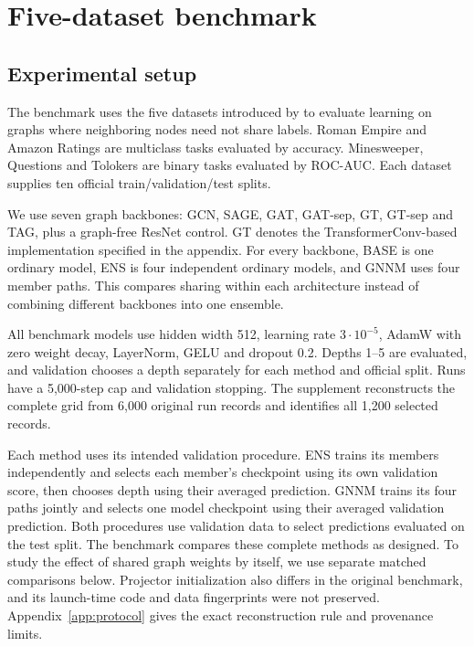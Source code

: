 \section{Five-dataset benchmark}\label{sec:original-benchmark}
\subsection{Experimental setup}
The benchmark uses the five datasets introduced by \citet{platonov2023critical} to evaluate learning on graphs where neighboring nodes need not share labels. Roman Empire and Amazon Ratings are multiclass tasks evaluated by accuracy. Minesweeper, Questions and Tolokers are binary tasks evaluated by ROC-AUC. Each dataset supplies ten official train/validation/test splits.

We use seven graph backbones: GCN, SAGE, GAT, GAT-sep, GT, GT-sep and TAG, plus a graph-free ResNet control. GT denotes the TransformerConv-based implementation specified in the appendix. For every backbone, BASE is one ordinary model, ENS is four independent ordinary models, and GNNM uses four member paths. This compares sharing within each architecture instead of combining different backbones into one ensemble.

All benchmark models use hidden width 512, learning rate $3\cdot10^{-5}$, AdamW with zero weight decay, LayerNorm, GELU and dropout 0.2. Depths 1--5 are evaluated, and validation chooses a depth separately for each method and official split. Runs have a 5,000-step cap and validation stopping. The supplement reconstructs the complete grid from 6,000 original run records and identifies all 1,200 selected records.

Each method uses its intended validation procedure. ENS trains its members independently and selects each member's checkpoint using its own validation score, then chooses depth using their averaged prediction. GNNM trains its four paths jointly and selects one model checkpoint using their averaged validation prediction. Both procedures use validation data to select predictions evaluated on the test split. The benchmark compares these complete methods as designed. To study the effect of shared graph weights by itself, we use separate matched comparisons below. Projector initialization also differs in the original benchmark, and its launch-time code and data fingerprints were not preserved. Appendix~\ref{app:protocol} gives the exact reconstruction rule and provenance limits.

